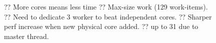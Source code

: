 \documentclass[sigconf,natbib=false]{acmart}
\begin{document}
\begin{figure}
	\caption{?? More cores means less time ?? Max-size work (129 work-items). ?? Need to dedicate 3 worker to beat independent cores. ?? Sharper perf increase when new physical core added. ?? up to 31 due to master thread.}
\end{figure}
\end{document}
